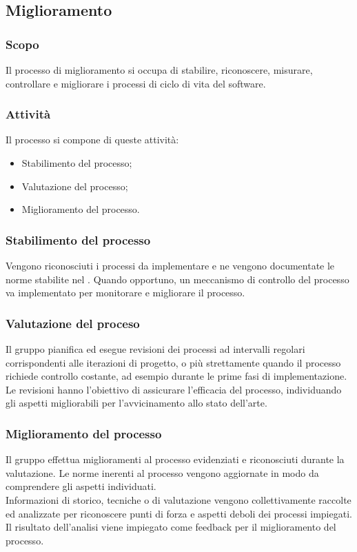 \subsection{Miglioramento}
\subsubsection{Scopo}
Il processo di miglioramento si occupa di stabilire, riconoscere, misurare, controllare e migliorare i processi di ciclo di vita del software.

\subsubsection{Attività}
Il processo si compone di queste attività:
\begin{itemize}
  \item Stabilimento del processo;
  \item Valutazione del processo;
  \item Miglioramento del processo.
\end{itemize}

\subsubsection{Stabilimento del processo}
Vengono riconosciuti i processi da implementare e ne vengono documentate le norme stabilite nel \WoW. Quando opportuno, un meccanismo di controllo del processo va implementato per monitorare e migliorare il processo.

\subsubsection{Valutazione del proceso}
Il gruppo pianifica ed esegue revisioni dei processi ad intervalli regolari corrispondenti alle iterazioni di progetto, o più strettamente quando il processo richiede controllo costante, ad esempio durante le prime fasi di implementazione.\\
Le revisioni hanno l'obiettivo di assicurare l'efficacia del processo, individuando gli aspetti migliorabili per l'avvicinamento allo stato dell'arte.

\subsubsection{Miglioramento del processo}
Il gruppo effettua miglioramenti al processo evidenziati e riconosciuti durante la valutazione. Le norme inerenti al processo vengono aggiornate in modo da comprendere gli aspetti individuati.\\
Informazioni di storico, tecniche o di valutazione vengono collettivamente raccolte ed analizzate per riconoscere punti di forza e aspetti deboli dei processi impiegati. Il risultato dell'analisi viene impiegato come feedback per il miglioramento del processo.
